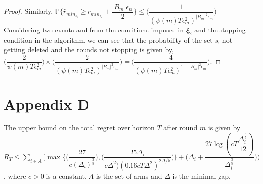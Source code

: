 \begin{proof}
\newline Similarly, $\mathbb{P}\lbrace\hat{r}_{min_{s_{i}}}\geq r_{min_{s_{i}}} + \dfrac{|B_{m}|\epsilon_{m}}{2}\rbrace\leq \bigg(\dfrac{1}{(\psi(m)T\epsilon_{m}^{2})^{|B_{m}|^{2}\epsilon_{m}}}\bigg)$
\newline Considering two events and from the conditions imposed in $\xi_{2}$ and the stopping condition in the algorithm, we can see that the probability of the set $s_{i}$ not getting deleted and the rounds not stopping is given by,
\newline
\hspace*{2em}$\bigg(\dfrac{2}{\psi(m)T\epsilon_{m}^{2}}\bigg)\times\bigg(\dfrac{2}{(\psi(m)T\epsilon_{m}^{2})^{|B_{m}|^{2}\epsilon_{m}}}\bigg)=\bigg(\dfrac{4}{(\psi(m)T\epsilon_{m}^{2})^{1+|B_{m}|^{2}\epsilon_{m}}}\bigg)$.
\end{proof}

\section*{Appendix D}
\begin{theorem}
The upper bound on the total regret over horizon $T$ after round $m$ is given by $R_{T}\leq \sum_{i\in A}\bigg (\max{\bigg\lbrace \bigg(\dfrac{27}{c(\Delta_{i})^{\frac{3}{5}}}\bigg) ,\bigg(\dfrac{25\Delta_{i}}{c\Delta^{2})(0.16cT\Delta^{2})^{2\Delta/5}}\bigg)\bigg\rbrace} + \bigg(\Delta_{i}+\dfrac{27\log{(cT\dfrac{\Delta_{i}^{\frac{8}{5}}}{12})}}{\Delta_{i}^{\frac{3}{5}}}\bigg)\bigg)$, where $c>0$ is a constant, $A$ is the set of arms and $\Delta$ is the minimal gap.
\end{theorem}

